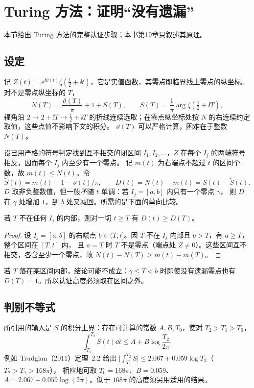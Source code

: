 \documentclass[11pt]{article}
\begin{document}
\section{Turing 方法：证明“没有遗漏”}
本节给出 Turing 方法的完整认证步骤；本书第19章只叙述其原理。

\subsection{设定}
记 $Z(t)=e^{\ii\vartheta(t)}\zeta(\tfrac12+\ii t)$，它是实值函数，其零点即临界线上零点的纵坐标。
对不是零点纵坐标的 $T$，
\[
 N(T)=\frac{\vartheta(T)}\pi+1+S(T),\qquad S(T)=\frac1\pi\arg\zeta(\tfrac12+\ii T),
\]
辐角沿 $2\to2+\ii T\to\tfrac12+\ii T$ 的折线连续选取；在零点纵坐标处按 $N$ 的右连续约定取值，这些点值不影响下文的积分。
$\vartheta(T)$ 可以严格计算，困难在于整数 $N(T)$。

设已用严格的符号判定找到互不相交的闭区间 $I_1,I_2,\dots$，$Z$ 在每个 $I_j$ 的两端符号相反，因而每个 $I_j$ 内至少有一个零点。
记 $m(t)$ 为右端点不超过 $t$ 的区间个数，故 $m(t)\le N(t)$。令
\[
 \widetilde S(t)=m(t)-1-\vartheta(t)/\pi,\qquad
 D(t)=N(t)-m(t)=S(t)-\widetilde S(t).
\]
$D$ 取非负整数值，但一般\emph{不}随 $t$ 单调：若 $I_j=[a,b]$ 内只有一个零点 $\gamma$，
则 $D$ 在 $\gamma$ 处增加 $1$，到 $b$ 处又减回。所需的是下面的单向比较。

\begin{lemma}\label{lem:D}
若 $T$ 不在任何 $I_j$ 的内部，则对一切 $t\ge T$ 有 $D(t)\ge D(T)$。
\end{lemma}
\begin{proof}
设 $I_j=[a,b]$ 的右端点 $b\in(T,t]$。因 $T$ 不在 $I_j$ 内部且 $b>T$，有 $a\ge T$，整个区间在 $[T,t]$ 内，
且 $a=T$ 时 $T$ 不是零点（端点处 $Z\ne0$）。这些区间互不相交，各含至少一个零点，故 $N(t)-N(T)\ge m(t)-m(T)$。
\end{proof}
若 $T$ 落在某区间内部，结论可能不成立：$\gamma\le T<b$ 时即使没有遗漏零点也有 $D(T)=1$。所以认证高度必须取在区间之外。

\subsection{判别不等式}
所引用的输入是 $S$ 的积分上界：存在可计算的常数 $A,B,T_0$，使对 $T_2>T_1>T_0$，
\[
 \int_{T_1}^{T_2}S(t)\dd t\le A+B\log\frac{T_2}{2\pi}.
\]
例如 Trudgian（2011）定理~2.2 给出 $\bigl|\int_{T_1}^{T_2}S\bigr|\le2.067+0.059\log T_2$（$T_2>T_1>168\pi$），
相应地可取 $T_0=168\pi$、$B=0.059$、$A=2.067+0.059\log(2\pi)$。低于 $168\pi$ 的高度须另用适用的结果。
\end{document}
